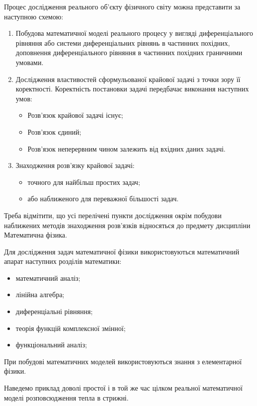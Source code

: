 Процес дослідження реального об'єкту фізичного світу можна представити за наступною схемою:
\begin{enumerate}
	\item Побудова математичної моделі реального процесу у вигляді диференціального рівняння або системи диференціальних рівнянь в частинних похідних, доповнення диференціального рівняння в частинних похідних граничними умовами.
	\item Дослідження властивостей сформульованої крайової задачі з точки зору її коректності. Коректність постановки задачі передбачає виконання наступних умов:
	\begin{itemize}
		\item Розв'язок крайової задачі існує;
		\item Розв'язок єдиний;
		\item Розв'язок неперервним чином залежить від вхідних даних задачі.
	\end{itemize}
	\item Знаходження розв'язку крайової задачі: 
	\begin{itemize}
		\item точного для найбільш простих задач;
		\item або наближеного для переважної більшості задач.
	\end{itemize}
\end{enumerate}

Треба відмітити, що усі перелічені пункти дослідження окрім побудови наближених методів знаходження розв'язків відносяться до предмету дисципліни Математична фізика. \medskip

Для дослідження задач математичної фізики використовуються математичний апарат наступних розділів математики:
\begin{itemize}
	\item математичний аналіз;
	\item лінійна алгебра;
	\item диференціальні рівняння;
	\item теорія функцій комплексної змінної;
	\item функціональний аналіз;
\end{itemize}

При побудові математичних моделей використовуються знання з елементарної фізики. \medskip

Наведемо приклад доволі простої і в той же час цілком реальної математичної моделі розповсюдження тепла в стрижні.

